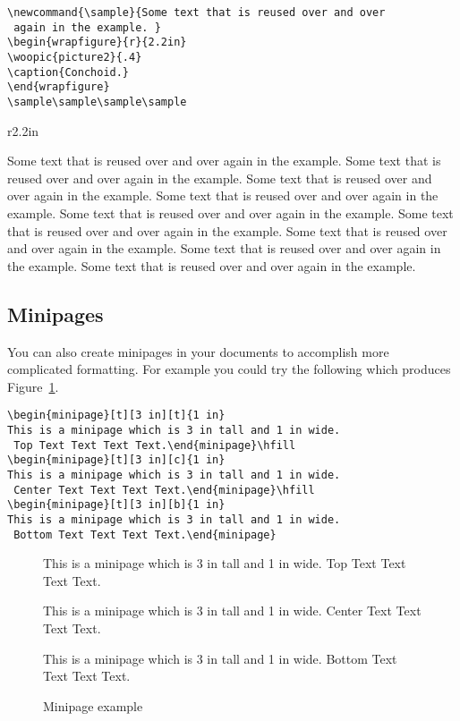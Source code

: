 \begin{singlespace}\small
\begin{verbatim}
\newcommand{\sample}{Some text that is reused over and over
 again in the example. }
\begin{wrapfigure}{r}{2.2in}
\woopic{picture2}{.4}
\caption{Conchoid.}
\end{wrapfigure}
\sample\sample\sample\sample
\end{verbatim}
\end{singlespace}

\newcommand{\sample}{Some text that is reused over and over again in the example. }
\begin{wrapfigure}{r}{2.2in}
\caption{Conchoid.}
\end{wrapfigure}
\sample\sample\sample\sample\sample\sample\sample\sample\sample


\subsection{Minipages}

You can also create minipages in your documents to accomplish more complicated formatting. For example you could try the following which produces Figure~\ref{Fig2}.
\begin{singlespace}\small
\begin{verbatim}
\begin{minipage}[t][3 in][t]{1 in}
This is a minipage which is 3 in tall and 1 in wide.
 Top Text Text Text Text.\end{minipage}\hfill
\begin{minipage}[t][3 in][c]{1 in}
This is a minipage which is 3 in tall and 1 in wide.
 Center Text Text Text Text.\end{minipage}\hfill
\begin{minipage}[t][3 in][b]{1 in}
This is a minipage which is 3 in tall and 1 in wide.
 Bottom Text Text Text Text.\end{minipage}
\end{verbatim}
\end{singlespace}

\begin{figure}[!htb]
\begin{minipage}[t][3 in][t]{1 in}
This is a minipage which is 3 in tall and 1 in wide. Top Text Text Text Text.
\end{minipage}
\hfill
\begin{minipage}[t][3 in][c]{1 in} This is a minipage which is 3 in tall and 1 in wide. Center Text Text Text Text.
\end{minipage}
\hfill
\begin{minipage}[t][3 in][b]{1 in}
This is a minipage which is 3 in tall and 1 in wide. Bottom Text Text Text Text.
\end{minipage}
\caption{Minipage example}\label{Fig2}
\end{figure}

